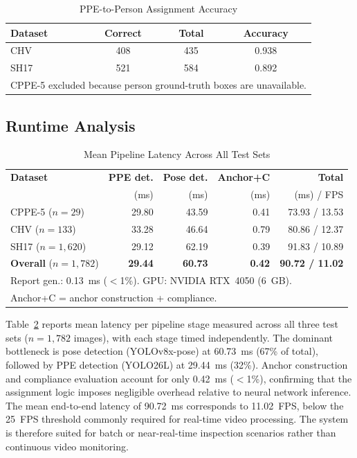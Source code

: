 \documentclass[conference,a4paper]{IEEEtran}
\begin{document}
\begin{table}[!htbp]
    \centering
    \caption{PPE-to-Person Assignment Accuracy}
    \label{tab:l2}
    \begin{tabular}{lccc}
        \hline
        \textbf{Dataset} &
        \textbf{Correct} & \textbf{Total} &
        \textbf{Accuracy} \\
        \hline
        CHV & 408 & 435 & 0.938 \\
        SH17& 521 & 584 & 0.892 \\
        \hline
        \multicolumn{4}{l}{\footnotesize CPPE-5 excluded because person ground-truth boxes are unavailable.} \\
    \end{tabular}
\end{table}


\subsection{Runtime Analysis}
\begin{table}[H]
    \centering
    \caption{Mean Pipeline Latency Across All Test Sets}
    \label{tab:runtime}
    \setlength{\tabcolsep}{4pt}
    \footnotesize
    \begin{tabular}{lrrrr}
        \hline
        \textbf{Dataset} & \textbf{PPE det.} & \textbf{Pose det.} & \textbf{Anchor+C} & \textbf{Total} \\
                         & (ms)              & (ms)               & (ms)              & (ms) / FPS     \\
        \hline
        CPPE-5 ($n=29$)      & 29.80 & 43.59 & 0.41 & 73.93 / 13.53 \\
        CHV ($n=133$)        & 33.28 & 46.64 & 0.79 & 80.86 / 12.37 \\
        SH17 ($n=1{,}620$)   & 29.12 & 62.19 & 0.39 & 91.83 / 10.89 \\
        \hline
        \textbf{Overall} ($n=1{,}782$) & \textbf{29.44} & \textbf{60.73} & \textbf{0.42} & \textbf{90.72 / 11.02} \\
        \hline
        \multicolumn{5}{l}{\footnotesize Report gen.: 0.13~ms ($<$1\%). GPU: NVIDIA RTX~4050 (6~GB).} \\
        \multicolumn{5}{l}{\footnotesize Anchor+C = anchor construction + compliance.} \\
    \end{tabular}
\end{table}


Table~\ref{tab:runtime} reports mean latency per pipeline stage measured across all three
test sets ($n = 1{,}782$ images), with each stage timed independently. The dominant
bottleneck is pose detection (YOLOv8x-pose) at 60.73~ms (67\% of total), followed by
PPE detection (YOLO26L) at 29.44~ms (32\%). Anchor construction and compliance
evaluation account for only 0.42~ms ($<$1\%), confirming that the assignment logic
imposes negligible overhead relative to neural network inference. The mean end-to-end
latency of 90.72~ms corresponds to 11.02~FPS, below the 25~FPS threshold commonly
required for real-time video processing. The system is therefore suited for batch or
near-real-time inspection scenarios rather than continuous video monitoring.
\end{document}

